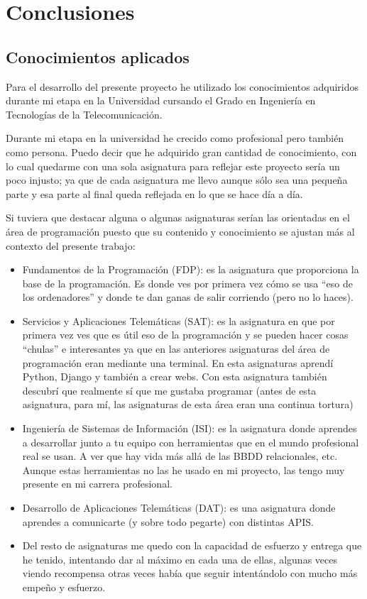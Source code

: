 \cleardoublepage
\chapter{Conclusiones}
\label{chap:conclusiones}


\section{Conocimientos aplicados} 
\label{sec:aplicados}


Para el desarrollo del presente proyecto he utilizado los conocimientos adquiridos durante mi etapa en la Universidad cursando el Grado en Ingeniería en Tecnologías de la Telecomunicación.


Durante mi etapa en la universidad he crecido como profesional pero también como persona. Puedo decir que he adquirido gran cantidad de conocimiento, con lo cual quedarme con una sola asignatura para reflejar este proyecto sería un poco injusto; ya que de cada asignatura me llevo aunque sólo sea una pequeña parte y esa parte al final queda reflejada en lo que se hace día a día.


Si tuviera que destacar alguna o algunas asignaturas serían las orientadas en el área de programación puesto que su contenido y conocimiento se ajustan más al contexto del presente trabajo:



\begin{itemize}
\item Fundamentos de la Programación (FDP): es la asignatura que proporciona la base de la programación. Es donde ves por primera vez cómo se usa “eso de los ordenadores” y donde te dan ganas de salir corriendo (pero no lo haces).
\item Servicios y Aplicaciones Telemáticas (SAT): es la asignatura en que por primera vez ves que es útil eso de la programación y se pueden hacer cosas “chulas” e interesantes ya que en las anteriores asignaturas del área de programación eran mediante una terminal. En esta asignaturas aprendí Python, Django y también a crear webs. Con esta asignatura también descubrí que realmente sí que me gustaba programar (antes de esta asignatura, para mí, las asignaturas de esta área eran una continua tortura)
\item Ingeniería de Sistemas de Información (ISI): es la asignatura donde aprendes a desarrollar junto a tu equipo con herramientas que en el mundo profesional real se usan. A ver que hay vida más allá de las BBDD relacionales, etc. Aunque estas herramientas no las he usado en mi proyecto, las tengo muy presente en mi carrera profesional.
\item Desarrollo de Aplicaciones Telemáticas (DAT): es una asignatura donde aprendes a comunicarte (y sobre todo pegarte) con distintas APIS. 
\item Del resto de asignaturas me quedo con la capacidad de esfuerzo y entrega que he tenido, intentando dar al máximo en cada una de ellas, algunas veces viendo recompensa otras veces había que seguir intentándolo con mucho más empeño y esfuerzo.
\end{itemize}


